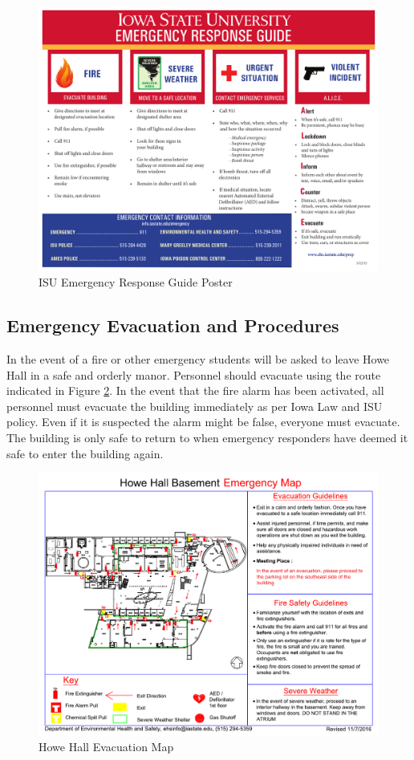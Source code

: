 \begin{figure}[ht]
\centering
\includegraphics[width=6in]{images/EmergencyPoster.pdf}
\caption{ISU Emergency Response Guide Poster}
\label{fig:Emergency_Response}
\end{figure}

\subsection{Emergency Evacuation and Procedures}
In the event of a fire or other emergency students will be asked to leave Howe Hall in a safe and orderly manor.  Personnel should evacuate using the route indicated in Figure \ref{fig:Evac_map}.  In the event that the fire alarm has been activated, all personnel must evacuate the building immediately as per Iowa Law and ISU policy.  Even if it is suspected the alarm might be false, everyone must evacuate.  The building is only safe to return to when emergency responders have deemed it safe to enter the building again.

\begin{figure}[ht]
\centering
\includegraphics[width=6in]{Howe-Bsmt.pdf}
\caption{Howe Hall Evacuation Map}
\label{fig:Evac_map}
\end{figure}

